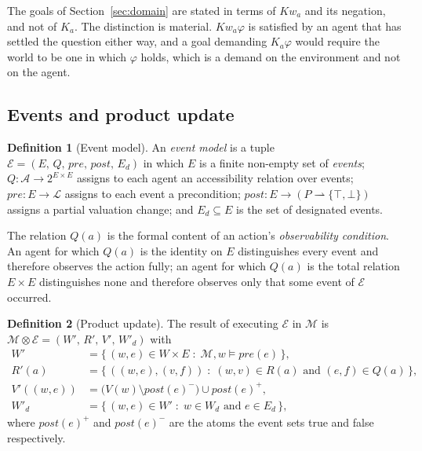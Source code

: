 \documentclass[11pt,a4paper]{article}
\theoremstyle{definition}
\newtheorem{definition}{Definition}
\newcommand{\Ag}{\mathcal{A}}
\newcommand{\Mod}{\mathcal{M}}
\newcommand{\Ev}{\mathcal{E}}
\newcommand{\prd}{\otimes}
\newcommand{\Kop}[1]{K_{#1}}
\newcommand{\Kw}[1]{\mathit{Kw}_{#1}}
\begin{document}
The goals of Section~\ref{sec:domain} are stated in terms of $\Kw{a}$ and its
negation, and not of $\Kop{a}$. The distinction is material. $\Kw{a}\varphi$ is
satisfied by an agent that has settled the question either way, and a goal
demanding $\Kop{a}\varphi$ would require the world to be one in which $\varphi$
holds, which is a demand on the environment and not on the agent.

\subsection{Events and product update}

\begin{definition}[Event model]
\label{def:event}
An \emph{event model} is a tuple $\Ev = (E,\, Q,\, \mathit{pre},\,
\mathit{post},\, E_d)$ in which $E$ is a finite non-empty set of \emph{events};
$Q : \Ag \to 2^{E \times E}$ assigns to each agent an accessibility relation
over events; $\mathit{pre} : E \to \mathcal{L}$ assigns to each event a
precondition; $\mathit{post} : E \to (P \rightharpoonup \{\top,\bot\})$ assigns
a partial valuation change; and $E_d \subseteq E$ is the set of designated
events.
\end{definition}

The relation $Q(a)$ is the formal content of an action's
\emph{observability condition}. An agent for which $Q(a)$ is the identity on
$E$ distinguishes every event and therefore observes the action fully; an agent
for which $Q(a)$ is the total relation $E \times E$ distinguishes none and
therefore observes only that some event of $\Ev$ occurred.

\begin{definition}[Product update]
\label{def:product}
The result of executing $\Ev$ in $\Mod$ is
$\Mod \prd \Ev = (W',\, R',\, V',\, W'_d)$ with
\begin{align*}
  W'    &= \{\,(w,e) \in W \times E \;:\; \Mod, w \models \mathit{pre}(e)\,\},\\
  R'(a) &= \{\,((w,e),(v,f)) \;:\; (w,v) \in R(a) \text{ and }
             (e,f) \in Q(a)\,\},\\
  V'((w,e)) &= \big(V(w) \setminus \mathit{post}(e)^{-}\big)
               \cup \mathit{post}(e)^{+},\\
  W'_d  &= \{\,(w,e) \in W' \;:\; w \in W_d \text{ and } e \in E_d\,\},
\end{align*}
where $\mathit{post}(e)^{+}$ and $\mathit{post}(e)^{-}$ are the atoms the event
sets true and false respectively.
\end{definition}
\end{document}
